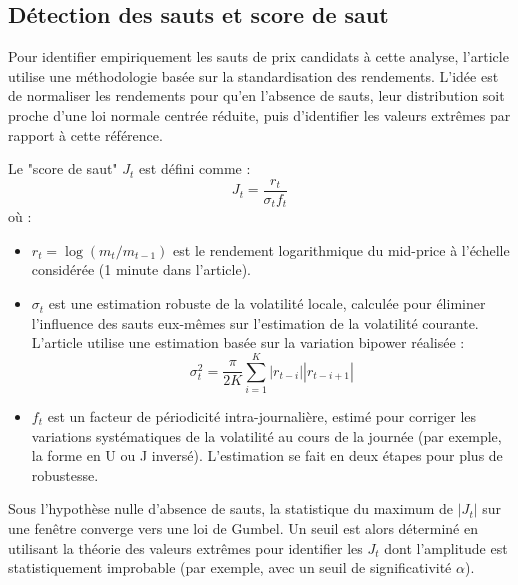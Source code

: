 \documentclass[10pt,a4paper]{article}
\theoremstyle{definition}
\theoremstyle{remark}
\begin{document}
    \subsection{Détection des sauts et score de saut}

    Pour identifier empiriquement les sauts de prix candidats à cette analyse, l'article \cite{marcaccioli2021exogenous} utilise une méthodologie basée sur la standardisation des rendements. L'idée est de normaliser les rendements pour qu'en l'absence de sauts, leur distribution soit proche d'une loi normale centrée réduite, puis d'identifier les valeurs extrêmes par rapport à cette référence.

    Le "score de saut" $J_t$ est défini comme :
    \begin{equation}
    J_t = \frac{r_t}{\sigma_t f_t}
    \end{equation}
    où :
    \begin{itemize}
        \item $r_t = \log(m_t / m_{t-1})$ est le rendement logarithmique du mid-price à l'échelle considérée (1 minute dans l'article).
        \item $\sigma_t$ est une estimation robuste de la volatilité locale, calculée pour éliminer l'influence des sauts eux-mêmes sur l'estimation de la volatilité courante. L'article utilise une estimation basée sur la variation bipower réalisée :
        \[ \sigma^2_t = \frac{\pi}{2 K} \sum_{i=1}^{K} |r_{t-i}| |r_{t-i+1}| \]
        \item $f_t$ est un facteur de périodicité intra-journalière, estimé pour corriger les variations systématiques de la volatilité au cours de la journée (par exemple, la forme en U ou J inversé). L'estimation se fait en deux étapes pour plus de robustesse.
    \end{itemize}

    Sous l'hypothèse nulle d'absence de sauts, la statistique du maximum de $|J_t|$ sur une fenêtre converge vers une loi de Gumbel. Un seuil est alors déterminé en utilisant la théorie des valeurs extrêmes pour identifier les $J_t$ dont l'amplitude est statistiquement improbable (par exemple, avec un seuil de significativité $\alpha$).

\end{document}
